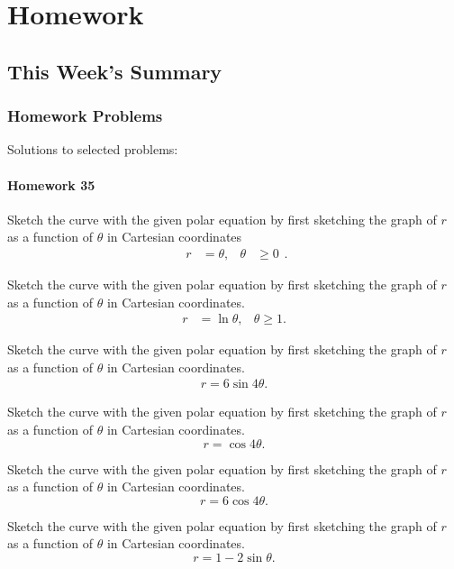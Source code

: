 \chapter{Homework}
\section{This Week's Summary}
\subsection{Homework Problems}
Solutions to selected problems:
\subsubsection{Homework 35}
\begin{problem}[WebAssign HW 35, \# 1]
Sketch the curve with the given polar equation by first sketching the graph
of $r$ as a function of $\theta$ in Cartesian coordinates
\[
\begin{aligned}
r&=\theta,&\theta &\geq 0
\end{aligned}.
\]
\end{problem}
\begin{problem}[WebAssign HW 35, \# 2]
Sketch the curve with the given polar equation by first sketching the graph
of $r$ as a function of $\theta$ in Cartesian coordinates.
\[
  \begin{aligned}
    r&=\ln\theta,&\theta\geq 1.
  \end{aligned}
\]
\end{problem}
\begin{problem}[WebAssign HW 35, \# 3]
Sketch the curve with the given polar equation by first sketching the graph
of $r$ as a function of $\theta$ in Cartesian coordinates.
\[
\begin{aligned}
r=6\sin 4\theta.
\end{aligned}
\]
\end{problem}
\begin{problem}[WebAssign HW 35, \# 4]
Sketch the curve with the given polar equation by first sketching the graph
of $r$ as a function of $\theta$ in Cartesian coordinates.
\[
r=\cos 4\theta.
\]
\end{problem}
\begin{problem}[WebAssign HW 35, \# 5]
Sketch the curve with the given polar equation by first sketching the graph
of $r$ as a function of $\theta$ in Cartesian coordinates.
\[
r=6\cos 4\theta.
\]
\end{problem}
\begin{problem}[WebAssign HW 35, \# 6]
Sketch the curve with the given polar equation by first sketching the graph
of $r$ as a function of $\theta$ in Cartesian coordinates.
\[
r=1-2\sin\theta.
\]
\end{problem}
